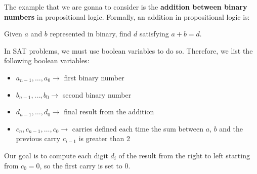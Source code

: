 The example that we are gonna to consider is the \textbf{addition between binary numbers} in propositional logic. Formally, an addition in propositional logic
is:
\begin{definition}[title = Decision problem]
    Given $a$ and $b$ represented in binary, find $d$ satisfying $a + b = d$.
\end{definition} 
In SAT problems, we must use boolean variables to do so. Therefore, we list the following boolean variables:
\begin{itemize}
    \renewcommand{\labelitemi}{-}
    \item $a_{n-1}, \dots, a_0 \rightarrow$ first binary number
    \item $b_{n-1}, \dots, b_0 \rightarrow$ second binary number
    \item $d_{n-1}, \dots, d_0 \rightarrow$ final result from the addition
    \item $c_{n}, c_{n-1}, \dots, c_0 \rightarrow$ carries defined each time the sum between $a$, $b$ and the previous carry $c_{i-1}$ is greater than 2
\end{itemize}
Our goal is to compute each digit $d_i$ of the result from the right to left starting from $c_0 = 0$, so the first carry is set to $0$.
